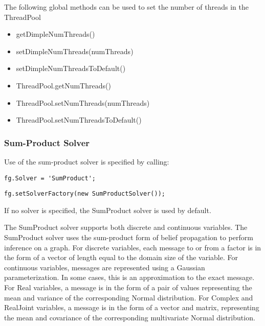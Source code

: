 The following global methods can be used to set the number of threads in the ThreadPool

\ifmatlab
\begin{itemize}
\item getDimpleNumThreads()
\item setDimpleNumThreads(numThreads)
\item setDimpleNumThreadsToDefault()
\end{itemize}
\fi

\ifjava
\begin{itemize}
\item ThreadPool.getNumThreads()
\item ThreadPool.setNumThreads(numThreads)
\item ThreadPool.setNumThreadsToDefault()
\end{itemize}
\fi


\subsubsection{Sum-Product Solver}
\label{sec:SumProductSolver}

Use of the sum-product solver is specified by calling:

\ifmatlab
\begin{lstlisting}
fg.Solver = 'SumProduct';
\end{lstlisting}
\fi

\ifjava
\begin{lstlisting}
fg.setSolverFactory(new SumProductSolver());
\end{lstlisting}
\fi

If no solver is specified, the SumProduct solver is used by default.

The SumProduct solver supports both discrete and continuous variables.  The SumProduct solver uses the sum-product form of belief propagation to perform inference on a graph.  For discrete variables, each message to or from a factor is in the form of a vector of length equal to the domain size of the variable.  For continuous variables, messages are represented using a Gaussian parameterization.  In some cases, this is an approximation to the exact message.  For Real variables, a message is in the form of a pair of values representing the mean and variance of the corresponding Normal distribution.  For Complex and RealJoint variables, a message is in the form of a vector and matrix, representing the mean and covariance of the corresponding multivariate Normal distribution.

